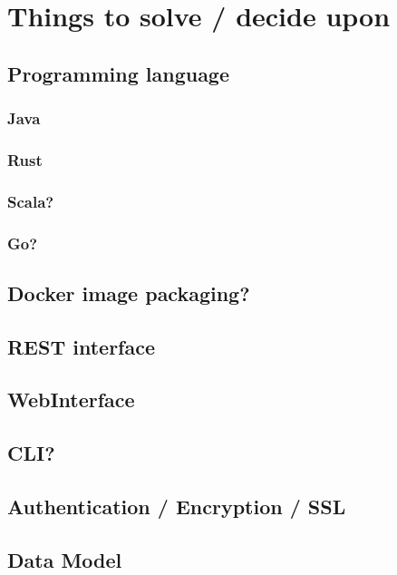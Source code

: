 \chapter{Things to solve / decide upon}

\section{Programming language}

\subsection{Java}
\subsection{Rust}
\subsection{Scala?}
\subsection{Go?}

\section{Docker image packaging?}

\section{REST interface}

\section{WebInterface}

\section{CLI?}

\section{Authentication / Encryption / SSL}

\section{Data Model}